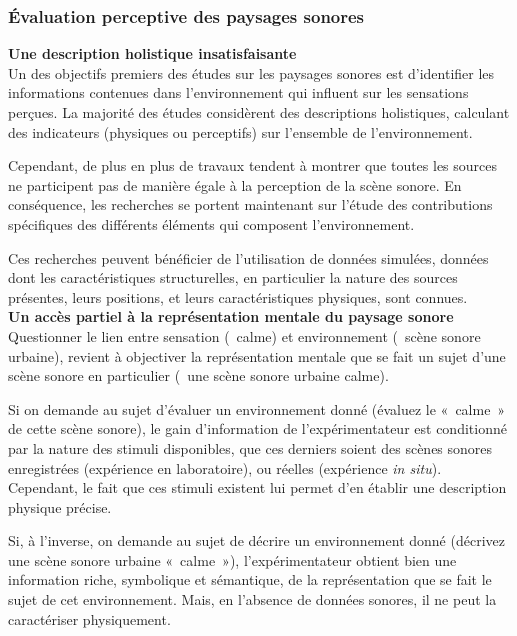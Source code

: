\subsubsection{Évaluation perceptive des paysages sonores}

{\setlength{\parindent}{0cm}\textbf{Une description holistique insatisfaisante}}\\

Un des objectifs premiers des études sur les paysages sonores est d'identifier les informations contenues dans l'environnement qui influent sur les sensations perçues. La majorité des études considèrent des descriptions holistiques, calculant des indicateurs (physiques ou perceptifs) sur l'ensemble de l'environnement.

Cependant, de plus en plus de travaux tendent à montrer que toutes les sources ne participent pas de manière égale à la perception de la scène sonore. En conséquence, les recherches se portent maintenant sur l'étude des contributions spécifiques des différents éléments qui composent l'environnement.

Ces recherches peuvent bénéficier de l'utilisation de données simulées, données dont les caractéristiques structurelles, en particulier la nature des sources présentes, leurs positions, et leurs caractéristiques physiques, sont connues. \\

{\setlength{\parindent}{0cm}\textbf{Un accès partiel à la représentation mentale du paysage sonore}} \\

Questionner le lien entre sensation (\eg~calme) et environnement (\eg~scène sonore urbaine), revient à objectiver la représentation mentale que se fait un sujet d'une scène sonore en particulier (\eg~une scène sonore urbaine calme).

Si on demande au sujet d'évaluer un environnement donné (évaluez le «~calme~» de cette scène sonore), le gain d'information de l'expérimentateur est conditionné par la nature des stimuli disponibles, que ces derniers soient des scènes sonores enregistrées (expérience en laboratoire), ou réelles (expérience \emph{in situ}). Cependant, le fait que ces stimuli existent lui permet d'en établir une description physique précise.

Si, à l'inverse, on demande au sujet de décrire un environnement donné (décrivez une scène sonore urbaine «~calme~»), l'expérimentateur obtient bien une information riche, symbolique et sémantique, de la représentation que se fait le sujet de cet environnement. Mais, en l'absence de données sonores, il ne peut la caractériser physiquement.

